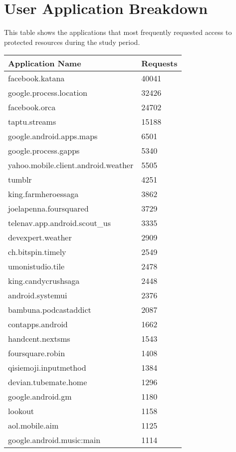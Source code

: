 \documentclass[letterpaper,twocolumn,10pt]{article}
\begin{document}
{\newpage

\section{User Application Breakdown}
\label{app:app_brekdown}

This table shows the applications that most frequently requested access to protected resources during the study period.
{\center
\small
\begin{tabular}{|l|l|}
\hline
\textbf{Application Name} & \textbf{Requests} \\ \hline
facebook.katana & 40041 \\ \hline
google.process.location & 32426 \\ \hline
facebook.orca & 24702 \\ \hline
taptu.streams & 15188 \\ \hline
google.android.apps.maps & 6501 \\ \hline
google.process.gapps & 5340 \\ \hline
yahoo.mobile.client.android.weather & 5505 \\ \hline
tumblr & 4251 \\ \hline
king.farmheroessaga & 3862 \\ \hline
joelapenna.foursquared & 3729 \\ \hline
telenav.app.android.scout\_us & 3335 \\ \hline
devexpert.weather & 2909 \\ \hline
ch.bitspin.timely & 2549 \\ \hline
umonistudio.tile & 2478 \\ \hline
king.candycrushsaga & 2448 \\ \hline
android.systemui & 2376 \\ \hline
bambuna.podcastaddict & 2087 \\ \hline
contapps.android & 1662 \\ \hline
handcent.nextsms & 1543 \\ \hline
foursquare.robin & 1408 \\ \hline
qisiemoji.inputmethod & 1384 \\ \hline
devian.tubemate.home & 1296 \\ \hline
google.android.gm & 1180 \\ \hline
lookout & 1158 \\ \hline
aol.mobile.aim & 1125 \\ \hline
google.android.music:main & 1114 \\ \hline

\end{tabular}}}
\end{document}
